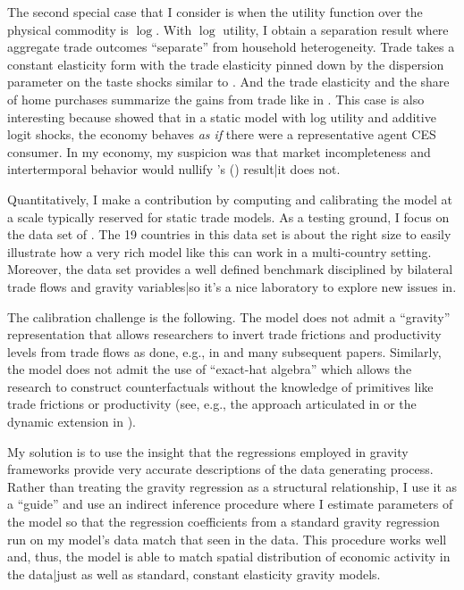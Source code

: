 \documentclass[12pt,pdftex]{article}
\def\citeapos#1{\citeauthor{#1}'s (\citeyear{#1})}
\begin{document}
\begin{onehalfspacing}
The second special case that I consider is when the utility function over the physical commodity is $\log$. With $\log$ utility, I obtain a separation result where aggregate trade outcomes ``separate'' from household heterogeneity. Trade takes a constant elasticity form with the trade elasticity pinned down by the dispersion parameter on the taste shocks similar to \citet{eaton2002technology}. And the trade elasticity and the share of home purchases summarize the gains from trade like in \citet{arkolakis2012new}. This case is also interesting because \citet*{anderson1987ces} showed that in a static model with log utility and additive logit shocks, the economy behaves \emph{as if} there were a representative agent CES consumer. In my economy, my suspicion was that market incompleteness and intertermporal behavior would nullify \citeapos{anderson1987ces} result|it does not.

Quantitatively, I make a contribution by computing and calibrating the model at a scale typically reserved for static trade models. As a testing ground, I focus on the data set of \citet{eaton2002technology}. The 19 countries in this data set is about the right size to easily illustrate how a very rich model like this can work in a multi-country setting. Moreover, the \citet{eaton2002technology} data set provides a well defined benchmark disciplined by bilateral trade flows and gravity variables|so it's a nice laboratory to explore new issues in.

The calibration challenge is the following. The model does not admit a ``gravity'' representation that allows researchers to invert trade frictions and productivity levels from trade flows as done, e.g., in \citet{eaton2002technology} and many subsequent papers. Similarly, the model does not admit the use of ``exact-hat algebra'' which allows the research to construct counterfactuals without the knowledge of primitives like trade frictions or productivity (see, e.g., the approach articulated in \citet{costinot2014trade} or the dynamic extension in \citet*{caliendo2015trade}).

My solution is to use the insight that the regressions employed in gravity frameworks provide very accurate descriptions of the data generating process. Rather than treating the gravity regression as a structural relationship, I use it as a ``guide'' and use an indirect inference procedure where I estimate parameters of the model so that the regression coefficients from a standard gravity regression run on my model's data match that seen in the data. This procedure works well and, thus, the model is able to match spatial distribution of economic activity in the data|just as well as standard, constant elasticity gravity models.


\end{onehalfspacing}
\end{document}
